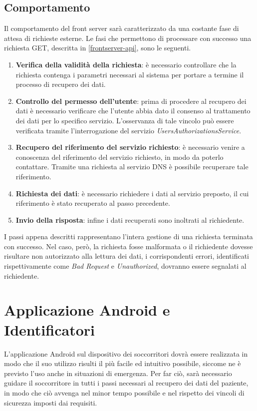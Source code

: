 \documentclass[a4paper,12pt]{report}
\begin{document}
\subsection{Comportamento} \label{frontserver-behaviour}
Il comportamento del front server sarà caratterizzato da una costante fase di attesa di richieste esterne. Le fasi che permettono di processare con successo una richiesta GET, descritta in \autoref{frontserver-api}, sono le seguenti.
\begin{enumerate}
	\item \textbf{Verifica della validità della richiesta}: è necessario controllare che la richiesta contenga i parametri necessari al sistema per portare a termine il processo di recupero dei dati.
	\item \textbf{Controllo del permesso dell'utente}: prima di procedere al recupero dei dati è necessario verificare che l'utente abbia dato il consenso al trattamento dei dati per lo specifico servizio. L'osservanza di tale vincolo può essere verificata tramite l'interrogazione del servizio \emph{UsersAuthorizationsService}.
	\item \textbf{Recupero del riferimento del servizio richiesto}: è necessario venire a conoscenza del riferimento del servizio richiesto, in modo da poterlo contattare. Tramite una richiesta al servizio DNS è possibile recuperare tale riferimento.
	\item \textbf{Richiesta dei dati}: è necessario richiedere i dati al servizio preposto, il cui riferimento è stato recuperato al passo precedente.
	\item \textbf{Invio della risposta}: infine i dati recuperati sono inoltrati al richiedente.
\end{enumerate}
I passi appena descritti rappresentano l'intera gestione di una richiesta terminata con successo. Nel caso, però, la richiesta fosse malformata o il richiedente dovesse risultare non autorizzato alla lettura dei dati, i corrispondenti errori, identificati rispettivamente come \emph{Bad Request} e \emph{Unauthorized}, dovranno essere segnalati al richiedente.


\section{Applicazione Android e Identificatori} \label{design_app}

L'applicazione Android sul dispositivo dei soccorritori dovrà essere realizzata in modo che il suo utilizzo risulti il più facile ed intuitivo possibile, siccome ne è previsto l'uso anche in situazioni di emergenza. Per far ciò, sarà necessario guidare il soccorritore in tutti i passi necessari al recupero dei dati del paziente, in modo che ciò avvenga nel minor tempo possibile e nel rispetto dei vincoli di sicurezza imposti dai requisiti.
\end{document}
